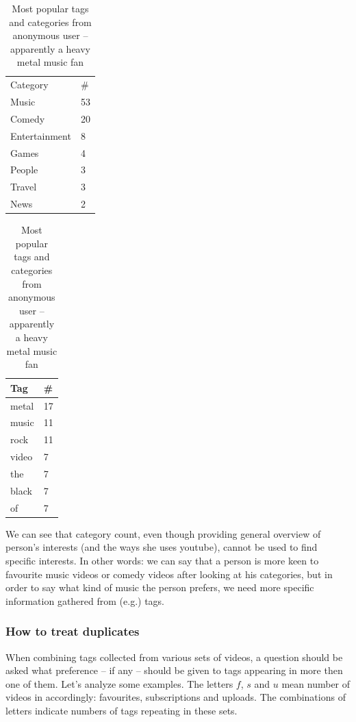 \documentclass{article}
\begin{document}
\begin{table}
\begin{minipage}[b]{0.5\linewidth}\centering

\begin{tabular}{| l | l |}
Category & \# \\
Music & 53 \\
Comedy & 20 \\
Entertainment & 8 \\
Games & 4 \\
People & 3 \\
Travel & 3 \\
News & 2 \\
\end{tabular}

\end{minipage}
\hspace{0.5cm}
\begin{minipage}[b]{0.5\linewidth}
\centering

\begin{tabular}{| l | l |}
Tag & \# \\ \hline
metal & 17 \\
music & 11 \\
rock & 11 \\
video & 7 \\
the & 7 \\
black & 7 \\
of & 7 \\
\end{tabular}

\end{minipage}

\caption{Most popular tags and categories from anonymous user -- apparently a
heavy metal music fan}
\end{table}

We can see that category count, even though providing general overview of
person's interests (and the ways she uses youtube), cannot be used to find
specific interests. In other words: we can say that a person is more keen to
favourite music videos or comedy videos after looking at his categories, but in
order to say what kind of music the person prefers, we need more specific
information gathered from (e.g.) tags.

\subsubsection{How to treat duplicates}

When combining tags collected from various sets of videos, a question should be
asked what preference -- if any -- should be given to tags appearing in more
then one of them. Let's analyze some examples. The letters $f$, $s$ and $u$ mean number
of videos in accordingly: favourites, subscriptions and uploads. The
combinations of letters indicate numbers of tags repeating in these sets.
\end{document}

